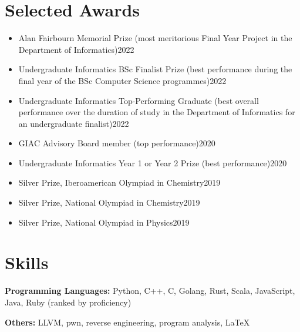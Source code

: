 \documentclass{resume}
\begin{document}
\section{Selected Awards}
\begin{itemize}
    \item Alan Fairbourn Memorial Prize (most meritorious Final Year Project in the
    Department of Informatics)\hfill 2022
    \item Undergraduate Informatics BSc Finalist Prize (best performance during the final year of the BSc Computer Science programmes)\hfill 2022
    \item Undergraduate Informatics Top-Performing Graduate (best overall performance over the duration of study in the
    Department of Informatics for an undergraduate finalist)\hfill 2022
    \item GIAC Advisory Board member (top performance)\hfill 2020
    \item Undergraduate Informatics Year 1 or Year 2 Prize (best performance)\hfill 2020
    \item Silver Prize, Iberoamerican Olympiad in Chemistry\hfill 2019
    \item Silver Prize, National Olympiad in Chemistry\hfill 2019
    \item Silver Prize, National Olympiad in Physics\hfill 2019
\end{itemize}




\section{Skills}
\textbf{Programming Languages:} \small Python, C++, C, Golang, Rust, Scala, JavaScript, Java, Ruby (ranked by proficiency)

\textbf{Others:} \small LLVM, pwn, reverse engineering, program analysis, \LaTeX
\end{document}
